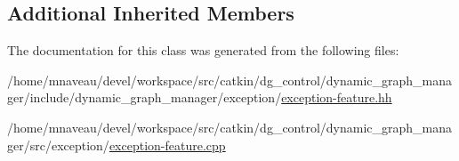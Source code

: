 \subsection*{Additional Inherited Members}


The documentation for this class was generated from the following files\+:\begin{DoxyCompactItemize}
\item 
/home/mnaveau/devel/workspace/src/catkin/dg\+\_\+control/dynamic\+\_\+graph\+\_\+manager/include/dynamic\+\_\+graph\+\_\+manager/exception/\hyperlink{exception-feature_8hh}{exception-\/feature.\+hh}\item 
/home/mnaveau/devel/workspace/src/catkin/dg\+\_\+control/dynamic\+\_\+graph\+\_\+manager/src/exception/\hyperlink{exception-feature_8cpp}{exception-\/feature.\+cpp}\end{DoxyCompactItemize}
